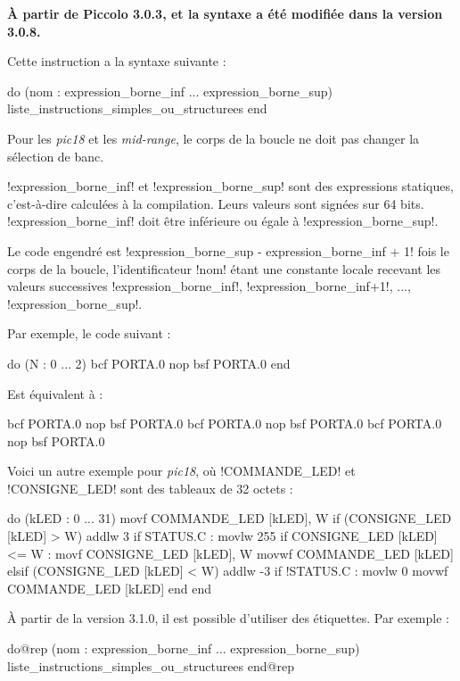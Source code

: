 
\textbf{À partir de Piccolo 3.0.3, et la syntaxe a été modifiée dans la version 3.0.8.}


Cette instruction a la syntaxe suivante :
\begin{piccolo}
do (nom : expression_borne_inf ... expression_borne_sup)
  liste_instructions_simples_ou_structurees
end
\end{piccolo}

Pour les \emph{pic18} et les \emph{mid-range}, le corps de la boucle ne doit pas changer la sélection de banc.

\pic!expression_borne_inf! et \pic!expression_borne_sup! sont des expressions statiques, c'est-à-dire calculées à la compilation. Leurs valeurs sont signées sur 64 bits. \pic!expression_borne_inf! doit être inférieure ou égale à \pic!expression_borne_sup!.

Le code engendré est \pic!expression_borne_sup - expression_borne_inf + 1! fois le corps de la boucle, l'identificateur \pic!nom! étant une constante locale recevant les valeurs successives \pic!expression_borne_inf!, \pic!expression_borne_inf+1!, ..., \pic!expression_borne_sup!.


Par exemple, le code suivant :
\begin{piccolo}
do (N : 0 ... 2)
  bcf PORTA.0
  nop
  bsf PORTA.0
end
\end{piccolo}

Est équivalent à :
\begin{piccolo}
bcf PORTA.0
nop
bsf PORTA.0
bcf PORTA.0
nop
bsf PORTA.0
bcf PORTA.0
nop
bsf PORTA.0
\end{piccolo}


Voici un autre exemple pour \emph{pic18}, où \pic!COMMANDE_LED! et \pic!CONSIGNE_LED! sont des tableaux de 32 octets :

\begin{piccolo}
do (kLED : 0 ... 31)
  movf COMMANDE_LED [kLED], W
  if (CONSIGNE_LED [kLED] > W)
    addlw 3
    if STATUS.C : movlw 255
    if CONSIGNE_LED [kLED] <= W : movf CONSIGNE_LED [kLED], W
    movwf COMMANDE_LED [kLED]
  elsif (CONSIGNE_LED [kLED] < W)
    addlw -3
    if !STATUS.C : movlw 0
    movwf COMMANDE_LED [kLED]
  end
end
\end{piccolo}



À partir de la version 3.1.0, il est possible d'utiliser des étiquettes. Par exemple :
\begin{piccolo}
do@rep (nom : expression_borne_inf ... expression_borne_sup)
  liste_instructions_simples_ou_structurees
end@rep
\end{piccolo}

